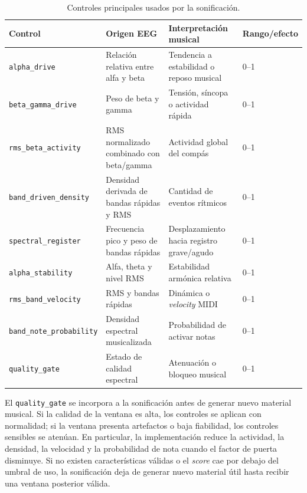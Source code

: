 \begin{table}[H]
    \centering
    \caption{Controles principales usados por la sonificación.}
    \label{tab:impl_sonificacion_controles}
    \renewcommand{\arraystretch}{1.15}
    \begin{tabular}{p{}p{}p{}p{}}
        \hline
        \textbf{Control} & \textbf{Origen EEG} & \textbf{Interpretación musical} & \textbf{Rango/efecto} \\
        \hline
        \texttt{alpha\_drive} & Relación relativa entre alfa y beta & Tendencia a estabilidad o reposo musical & 0--1 \\
        \texttt{beta\_gamma\_drive} & Peso de beta y gamma & Tensión, síncopa o actividad rápida & 0--1 \\
        \texttt{rms\_beta\_activity} & RMS normalizado combinado con beta/gamma & Actividad global del compás & 0--1 \\
        \texttt{band\_driven\_density} & Densidad derivada de bandas rápidas y RMS & Cantidad de eventos rítmicos & 0--1 \\
        \texttt{spectral\_register} & Frecuencia pico y peso de bandas rápidas & Desplazamiento hacia registro grave/agudo & 0--1 \\
        \texttt{alpha\_stability} & Alfa, theta y nivel RMS & Estabilidad armónica relativa & 0--1 \\
        \texttt{rms\_band\_velocity} & RMS y bandas rápidas & Dinámica o \textit{velocity} MIDI & 0--1 \\
        \texttt{band\_note\_probability} & Densidad espectral musicalizada & Probabilidad de activar notas & 0--1 \\
        \texttt{quality\_gate} & Estado de calidad espectral & Atenuación o bloqueo musical & 0--1 \\
        \hline
    \end{tabular}
\end{table}

El \texttt{quality\_gate} se incorpora a la sonificación antes de generar nuevo material musical. Si la calidad de la ventana es alta, los controles se aplican con normalidad; si la ventana presenta artefactos o baja fiabilidad, los controles sensibles se atenúan. En particular, la implementación reduce la actividad, la densidad, la velocidad y la probabilidad de nota cuando el factor de puerta disminuye. Si no existen características válidas o el \textit{score} cae por debajo del umbral de uso, la sonificación deja de generar nuevo material útil hasta recibir una ventana posterior válida.


